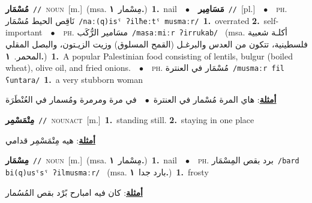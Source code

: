 \documentclass[10pt,a4paper,twoside]{article} %
\begin{document}
\begin{multicols}{2}
{\setlength\topsep{0pt}\textbf{\foreignlanguage{arabic}{مُسْمَار}}\ {\color{gray}\texttt{//}\color{black}}\ \textsc{noun}\ [m.]\ \color{gray}(msa. \foreignlanguage{arabic}{مِسْمار}~\foreignlanguage{arabic}{\textbf{١.}})\color{black}\ \textbf{1.}~nail\ \ $\bullet$\ \ \setlength\topsep{0pt}\textbf{\foreignlanguage{arabic}{مَسَامِير}}\ {\color{gray}\texttt{//}\color{black}}\ [pl.]\ \ $\bullet$\ \ \textsc{ph.} \color{gray} \foreignlanguage{arabic}{نَاقِص الحيط مُسْمَار}\color{black}\ {\color{gray}\texttt{/{\sffamily naː(q)isˤ ʔilħeːtˤ musmaːr}/}\color{black}}\ \textbf{1.}~overrated  \textbf{2.}~self-important\ \ $\bullet$\ \ \textsc{ph.} \color{gray} \foreignlanguage{arabic}{مسَامير الرُّكَب}\color{black}\ {\color{gray}\texttt{/{\sffamily masaːmiːr ʔirrukab}/}\color{black}}\ \color{gray} (msa. \foreignlanguage{arabic}{أكلـة شعبية فلسطينية، تتكون من العدس والبرغـل (القمح المسلوق) وزيت الزيـتون، والبصل المقلي المحمر.}~\foreignlanguage{arabic}{\textbf{١.}})\color{black}\ \textbf{1.}~A popular Palestinian food consisting of lentils, bulgur (boiled wheat), olive oil, and fried onions.\ \ $\bullet$\ \ \textsc{ph.} \color{gray} \foreignlanguage{arabic}{مُسْمَار في العنترة}\color{black}\ {\color{gray}\texttt{/{\sffamily musmaːr fil ʕuntara}/}\color{black}}\ \textbf{1.}~a very stubborn woman\  \begin{flushright}\color{gray}\foreignlanguage{arabic}{\textbf{\underline{\foreignlanguage{arabic}{أمثلة}}}: هاي المرة مُسْمار في العنترة\ $\bullet$\ \  في مرة ومرمرة ومُسمار في العُنْطَرَة}\end{flushright}\color{black}} \vspace{2mm}

{\setlength\topsep{0pt}\textbf{\foreignlanguage{arabic}{مِتْمَسْمِر}}\ {\color{gray}\texttt{//}\color{black}}\ \textsc{noun\textunderscore act}\ [m.]\ \textbf{1.}~standing still.  \textbf{2.}~staying in one place\  \begin{flushright}\color{gray}\foreignlanguage{arabic}{\textbf{\underline{\foreignlanguage{arabic}{أمثلة}}}: هيه مِتْمَسْمِر قدامي}\end{flushright}\color{black}} \vspace{2mm}

{\setlength\topsep{0pt}\textbf{\foreignlanguage{arabic}{مِسْمَار}}\ {\color{gray}\texttt{//}\color{black}}\ \textsc{noun}\ [m.]\ \color{gray}(msa. \foreignlanguage{arabic}{مِسْمار}~\foreignlanguage{arabic}{\textbf{١.}})\color{black}\ \textbf{1.}~nail\ \ $\bullet$\ \ \textsc{ph.} \color{gray} \foreignlanguage{arabic}{برد بقص المِسْمَار}\color{black}\ {\color{gray}\texttt{/{\sffamily bard bi(q)usˤsˤ ʔilmusmaːr}/}\color{black}}\ \color{gray} (msa. \foreignlanguage{arabic}{بارد جدا}~\foreignlanguage{arabic}{\textbf{١.}})\color{black}\ \textbf{1.}~frosty\  \begin{flushright}\color{gray}\foreignlanguage{arabic}{\textbf{\underline{\foreignlanguage{arabic}{أمثلة}}}: كان فيه امبارح بًرْد بقص المُسُمار}\end{flushright}\color{black}} \vspace{2mm}


\end{multicols}
\end{document}
